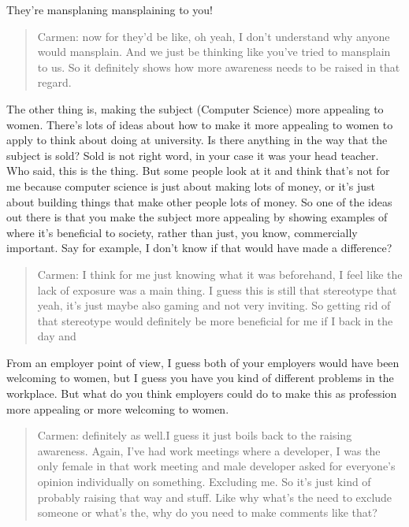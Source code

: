 \documentclass[
]{book}
\begin{document}
They're mansplaning mansplaining to you!

\begin{quote}
Carmen: now for they'd be like, oh yeah, I don't understand why anyone would mansplain. And we just be thinking like you've tried to mansplain to us. So it definitely shows how more awareness needs to be raised in that regard.
\end{quote}

The other thing is, making the subject (Computer Science) more appealing to women. There's lots of ideas about how to make it more appealing to women to apply to think about doing at university. Is there anything in the way that the subject is sold? Sold is not right word, in your case it was your head teacher. Who said, this is the thing. But some people look at it and think that's not for me because computer science is just about making lots of money, or it's just about building things that make other people lots of money. So one of the ideas out there is that you make the subject more appealing by showing examples of where it's beneficial to society, rather than just, you know, commercially important. Say for example, I don't know if that would have made a difference?

\begin{quote}
Carmen: I think for me just knowing what it was beforehand, I feel like the lack of exposure was a main thing. I guess this is still that stereotype that yeah, it's just maybe also gaming and not very inviting. So getting rid of that stereotype would definitely be more beneficial for me if I back in the day and
\end{quote}

From an employer point of view, I guess both of your employers would have been welcoming to women, but I guess you have you kind of different problems in the workplace. But what do you think employers could do to make this as profession more appealing or more welcoming to women.

\begin{quote}
Carmen: definitely as well.I guess it just boils back to the raising awareness. Again, I've had work meetings where a developer, I was the only female in that work meeting and male developer asked for everyone's opinion individually on something. Excluding me. So it's just kind of probably raising that way and stuff. Like why what's the need to exclude someone or what's the, why do you need to make comments like that?
\end{quote}
\end{document}
